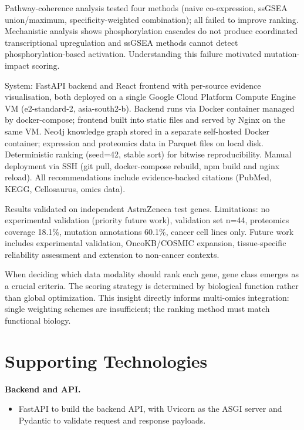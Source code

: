 \documentclass[author={Karen Coutinho, Ishaan Bhalla, Aman Raj, Dixit Kaloorani Malarmannan},
                supervisor={Dr. Daniel D'Andrea},
                degree={MSc},
                title={CellSelector Omics: A Multi-Omics Recommendation System for Cell Line Selection},
                subtitle={},
                type={},
                year={2026}]{dissertation}
\begin{document}
Pathway-coherence analysis tested four methods (naive co-expression, ssGSEA union/maximum, specificity-weighted combination); all failed to improve ranking. Mechanistic analysis shows phosphorylation cascades do not produce coordinated transcriptional upregulation and ssGSEA methods cannot detect phosphorylation-based activation. Understanding this failure motivated mutation-impact scoring.

System: FastAPI backend and React frontend with per-source evidence visualisation, both deployed on a single Google Cloud Platform Compute Engine VM (e2-standard-2, asia-south2-b). Backend runs via Docker container managed by docker-compose; frontend built into static files and served by Nginx on the same VM. Neo4j knowledge graph stored in a separate self-hosted Docker container; expression and proteomics data in Parquet files on local disk. Deterministic ranking (seed=42, stable sort) for bitwise reproducibility. Manual deployment via SSH (git pull, docker-compose rebuild, npm build and nginx reload). All recommendations include evidence-backed citations (PubMed, KEGG, Cellosaurus, omics data).

Results validated on independent AstraZeneca test genes. Limitations: no experimental validation (priority future work), validation set n=44, proteomics coverage 18.1\%, mutation annotations 60.1\%, cancer cell lines only. Future work includes experimental validation, OncoKB/COSMIC expansion, tissue-specific reliability assessment and extension to non-cancer contexts.

When deciding which data modality should rank each gene, gene class emerges as a crucial criteria. The scoring strategy is determined by biological function rather than global optimization. This insight directly informs multi-omics integration: single weighting schemes are insufficient; the ranking method must match functional biology.

\chapter*{Supporting Technologies}

\textbf{Backend and API.}
\begin{itemize}
    \item FastAPI to build the backend API, with Uvicorn as the ASGI server and Pydantic to validate request and response payloads.
\end{itemize}
\end{document}
